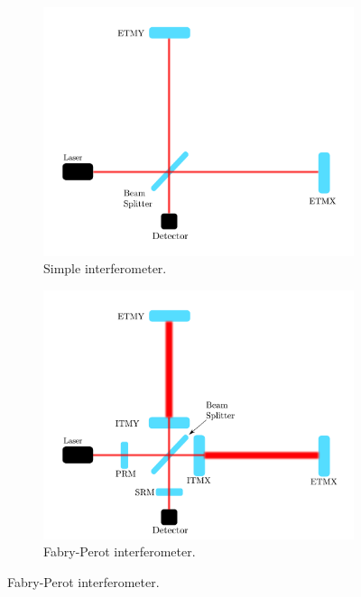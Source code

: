 \begin{figure}[hp]
    \centering
    \begin{subfigure}[h]{0.6\linewidth}
    	 \includegraphics[width=\textwidth]{C1_intro/interferometer.pdf}
    	 \caption{Simple interferometer.}
    	 \label{detectors:interferometer:simple}
    \end{subfigure}
	\begin{subfigure}[h]{0.6\linewidth}
		\includegraphics[width=\textwidth]{C1_intro/interferometer_fabry.pdf}
		\caption{Fabry-Perot interferometer.}
		\label{detectors:interferometer:fabry}
	\end{subfigure}

\end{figure}
